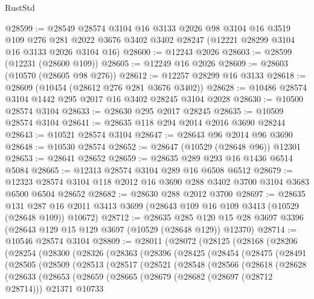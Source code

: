 \begin{lexlean}{RustStd}
\begin{coremodule}
@28599 := @28549
    @28574
    @3104
    @16
    @3133
    @2026
    @98
    @3104
    @16
    @3519
    @109
    @276
    @281
    @2022
    @3676
    @3402
    @3402
    @28247
    (@12221 @28299 @3104 @16 @3133 @2026 @3104 @16)
@28600 := @12243 @2026
@28603 := @28599 (@12231 (@28600 @109))
@28605 := @12249 @16 @2026
@28609 := @28603 (@10570 (@28605 @98 @276))
@28612 := @12257 @28299 @16 @3133
@28618 := @28609 (@10454 (@28612 @276 @281 @3676 @3402))
@28628 := @10486 @28574 @3104 @1442 @295 @2017 @16 @3402 @28245 @3104 @2028
@28630 := @10500 @28574 @3104
@28633 := @28630 @295 @2017 @28245
@28635 := @10509 @28574 @3104
@28641 := @28635 @118 @294 @2014 @2016 @3690 @28244
@28643 := @10521 @28574 @3104
@28647 := @28643 @96 @2014 @96 @3690
@28648 := @10530 @28574
@28652 := @28647 (@10529 (@28648 @96)) @12301
@28653 := @28641 @28652
@28659 := @28635 @289 @293 @16 @1436 @6514 @5084
@28665 := @12313 @28574 @3104 @289 @16 @6508 @6512
@28679 := @12323 @28574 @3104 @118 @2012 @16 @3690 @288 @3402 @3700 @3104 @3683 @6500 @6504 @28652
@28682 := @28630 @288 @2012 @3700
@28697 := @28635
    @131
    @287
    @16
    @2011
    @3413
    @3699
    (@28643 @109 @16 @109 @3413 (@10529 (@28648 @109)) @10672)
@28712 := @28635
    @285
    @120
    @15
    @28
    @3697
    @3396
    (@28643 @129 @15 @129 @3697 (@10529 (@28648 @129)) @12370)
@28714 := @10546 @28574 @3104
@28809 := @28011
    (@28072
      (@28125
        (@28168
          (@28206
            (@28254
              (@28300
                (@28326
                  (@28363
                    (@28396
                      (@28425
                        (@28454
                          (@28475
                            (@28491
                              (@28505
                                (@28509
                                  (@28513
                                    (@28517
                                      (@28521
                                        (@28548
                                          (@28566
                                            (@28618
                                              (@28628
                                                (@28633
                                                  (@28653
                                                    (@28659
                                                      (@28665
                                                        (@28679
                                                          (@28682 (@28697 (@28712 @28714)))
                                                          @21371
                                                          @10733

\end{coremodule}
\end{lexlean}
